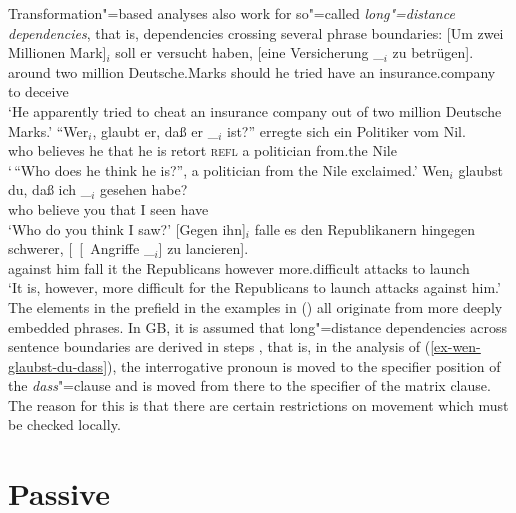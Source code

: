 Transformation"=based analyses also work for so"=called \emph{long"=distance dependencies}, that is, dependencies
crossing several phrase boundaries:
\eal
\label{bsp-Fernabhaengigkeit}
\ex\label{bsp-um-zwei-millionen}
\gll {}[Um zwei Millionen Mark]$_i$ soll er versucht haben, [eine Versicherung \_$_i$ zu betrügen].\footnotemark\\
     {}\spacebr{}around two million Deutsche.Marks should he tried have \spacebr{}an insurance.company {} to deceive\\
\glt `He apparently tried to cheat an insurance company out of two million Deutsche Marks.'
\ex
\gll "`Wer$_i$, glaubt er, daß er \_$_i$ ist?"' erregte sich ein Politiker vom Nil.\footnotemark\\
     \spacebr{}who believes he that he {} is retort \textsc{refl} a politician from.the Nile\\
\glt `\,``Who does he think he is?'', a politician from the Nile exclaimed.'
\ex\label{ex-wen-glaubst-du-dass}
\gll Wen$_i$ glaubst du, daß ich \_$_i$ gesehen habe?\footnotemark\\
     who believe you that I {} seen have\\
\glt `Who do you think I saw?'
\ex 
\gll {}[Gegen ihn]$_i$ falle es den Republikanern hingegen schwerer, [~[~Angriffe \_$_i$] zu lancieren].\footnotemark\\
	 {}\spacebr{}against him fall it the Republicans however more.difficult \hspaceThis{[~[~}attacks {} to launch\\
\glt `It is, however, more difficult for the Republicans to launch attacks against him.'
\zl
The elements in the prefield in the examples in () all originate from more deeply embedded phrases. In GB,
it is assumed that long"=distance dependencies across sentence boundaries are derived in steps 
\citep[--79]{Grewendorf88a}, that is, in the analysis of (\ref{ex-wen-glaubst-du-dass}), the interrogative
pronoun is moved to the specifier position of the \emph{dass}"=clause and is moved from there to the specifier of
the matrix clause. The reason for this is that there are certain restrictions on movement which must be checked
locally.%

\section{Passive}
\label{Abschnitt-GB-Passiv}\label{sec-passive-gb}

